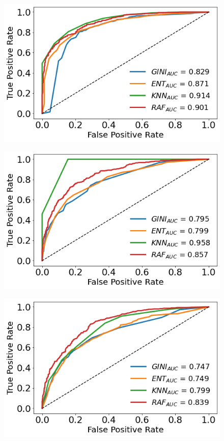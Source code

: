 \documentclass[a4paper,11pt,dvipsnames]{article}
\begin{document}
\begin{figure}[h]
\begin{minipage}[b]{.3\linewidth}
\centering\large \includegraphics[width=0.9\linewidth]{familiarity_ROC_c.png}
\label{fig:famroc}
\end{minipage}%
    \hfil
\begin{minipage}[b]{.3\linewidth}
\centering\includegraphics[width=0.9\linewidth]{semsize_ROC_c.png}\label{fig:semroc}
\end{minipage}    \hfil
\begin{minipage}[b]{.3\linewidth}
\centering\includegraphics[width=0.9\linewidth]{masculinity_ROC_c.png}\label{fig:masroc}
\end{minipage}


\end{figure}
\end{document}
